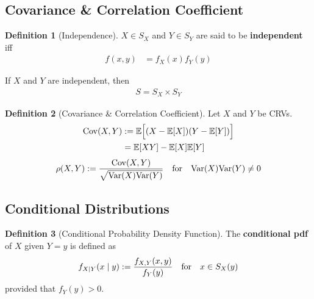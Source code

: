 \documentclass[10pt,UTF8]{article}
\newenvironment{definition box}
{\begin{tcolorbox}[colback=blue!5!white,colframe=blue!75!black,parbox=false,before upper=\par,before lower=\par]}
{\end{tcolorbox}}
\newenvironment{theorem box}
{\begin{tcolorbox}[colback=yellow!5!white,colframe=yellow!75!black,parbox=false,before upper=\par,before lower=\par]}
{\end{tcolorbox}}
\theoremstyle{definition}
\newtheorem{definition inner}{Definition}[section]
\newenvironment{definition}[1][]
{\begin{definition box}\begin{definition inner}[#1]\hfill\par}
{\end{definition inner}\end{definition box}}
\theoremstyle{plain}
\newtheorem{theorem inner}{Theorem}[section]
\theoremstyle{definition}
\newtheorem*{proof inner}{\textit{Proof}}
\theoremstyle{remark}
\newcommand{\E}[1]{\mathbb{E}\qty[#1]}  %
\newcommand{\Var}{\mathrm{Var}\qty}  %
\newcommand{\Cov}{\mathrm{Cov}\qty}  %
\begin{document}
\subsection{Covariance \& Correlation Coefficient}

\begin{definition}[Independence]
    $X\in S_X$ and $Y\in S_Y$ are said to be \textbf{independent}
    iff
    \begin{align*}
        f(x,y) &= f_X(x)f_Y(y)
    \end{align*}
\end{definition}

If $X$ and $Y$ are independent, then
\begin{gather*}
    S = S_X\times S_Y
\end{gather*}

\begin{definition}[Covariance \& Correlation Coefficient]
    Let $X$ and $Y$ be CRVs.
    \begin{align*}
        \Cov(X,Y) &:= \E{(X-\E{X})(Y-\E{Y})\vphantom{\Big|}} \\
        &= \E{X Y} - \E{X}\E{Y}
    \end{align*}
    \begin{gather*}
        \rho(X,Y) := \frac{\Cov(X,Y)}{\sqrt{\Var(X)\Var(Y)}}
        \qfor \Var(X)\Var(Y) \neq 0
    \end{gather*}
\end{definition}

\subsection{Conditional Distributions}


\begin{definition}[Conditional Probability Density Function]
    The \textbf{conditional pdf} of $X$ given $Y=y$ is defined as
    \begin{equation*}
        f_{X|Y}(x\mid y) := \frac{f_{X,Y}(x,y)}{f_Y(y)}
        \qfor x\in S_X(y)
    \end{equation*}
    provided that $f_Y(y)>0$.
\end{definition}
\end{document}
